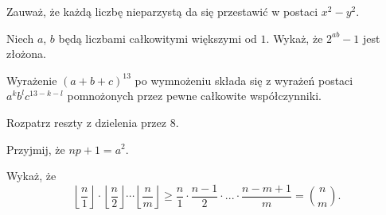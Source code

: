 
\begin{hints_list}
	\item Zauważ, że każdą liczbę nieparzystą da się przestawić w postaci $x^2 - y^2$.
	\item Niech $a$, $b$ będą liczbami całkowitymi większymi od $1$. Wykaż, że $2^{ab} - 1$ jest złożona.
	\item Wyrażenie $(a + b + c)^{13}$ po wymnożeniu składa się z wyrażeń postaci $a^kb^lc^{13 - k - l}$ pomnożonych przez pewne całkowite współczynniki.
	\item Rozpatrz reszty z dzielenia przez $8$.
	\item Przyjmij, że $np + 1 = a^2$.
	\item Wykaż, że 
	\[
		\left \lfloor \frac{n}{1} \right \rfloor \cdot \left \lfloor \frac{n}{2} \right \rfloor \cdots \left \lfloor \frac{n}{m} \right \rfloor \geqslant \frac{n}{1} \cdot \frac{n - 1}{2} \cdot ... \cdot \frac{n - m + 1}{m} = {{n}\choose{m}}.
	\]
\end{hints_list}